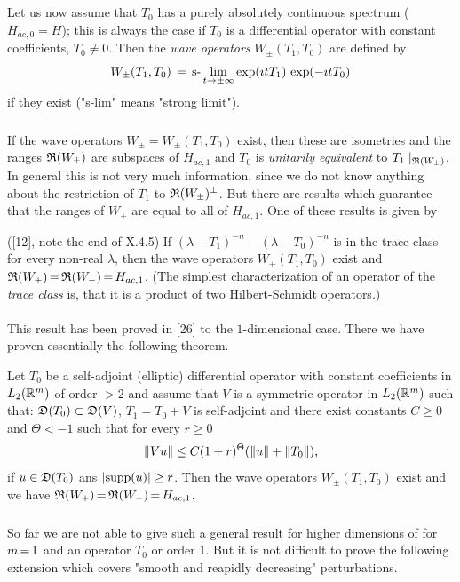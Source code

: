 \documentclass[11pt,twoside]{article}
\begin{document}
\subparagraph*{}
Let us now assume that $T_0$ has a purely absolutely continuous spectrum
({\ie} $H_{ac,0} = H$);
this is always the case if $T_0$ is a differential operator with constant
coefficients, $T_0 \neq 0$.
Then the \textit{wave operators} $W_{\pm}(T_1,T_0)$ are defined by
\[
W_{\pm}(T_1,T_0) \=
\mbox{s-}\lim_{t \to \pm \infty} \exp(itT_1) \, \exp(-itT_0)
\]
if they exist ("s-lim" means "strong limit").

\subparagraph*{}
If the wave operators $W_{\pm} = W_{\pm}(T_1,T_0)$ exist,
then these are isometries and the ranges $\range{W_{\pm}}$ are subspaces of
$H_{ac,1}$ and $T_0$ is \textit{unitarily equivalent}
to $T_1\mid_{\range{W_{\pm}}}$.
In general this is not very much information,
since we do not know anything about the restriction of $T_1$
to $\range{W_{\pm}}^{\bot}$.
But there are results which guarantee that the ranges of $W_{\pm}$ are equal
to all of $H_{ac,1}$.
One of these results is given by

\begin{theorem}([12], note the end of X.4.5)
If $(\lambda-T_1)^{-n} - (\lambda-T_0)^{-n}$ is in the trace class
for every non-real $\lambda$,
then the wave operators $W_{\pm}(T_1,T_0)$ exist and
$\range{W_+} \eq \range{W_-} \eq H_{ac,1}$.
(The simplest characterization of an operator of the \textit{trace class} is,
that it is a product of two Hilbert-Schmidt operators.)
\end{theorem}

\paragraph*{}
This result has been proved in [26] to the $1$-dimensional case.
There we have proven essentially the following theorem.

\begin{theorem}
Let $T_0$ be a self-adjoint (elliptic) differential operator with constant
coefficients in $L_2(\R^m)$ of order $>2$ and assume that $V$ is a symmetric
operator in $L_2(\R^m)$ such that:
$\domain{T_0} \subset \domain{V}$,
$T_1 = T_0 + V$ is self-adjoint and there exist constants $C \geq 0$ and
$\Theta < -1$ such that for every $r \geq 0$
\[
\norm{V u} \leq C (1+r)^{\Theta} (\norm{u} + \norm{T_0}),
\]
if $u \in \domain{T_0}$ ans $\abs{\supp{u}} \geq r$.
Then the wave operators $W_{\pm}(T_1,T_0)$ exist and we have 
$\range{W_+} \eq \range{W_-} \eq H_{ac,1}$.
\end{theorem}

\subparagraph*{}
So far we are not able to give such a general result for higher dimensions
of for $m \eq 1$ and an operator $T_0$ or order $1$.
But it is not difficult to prove the following extension which covers
"smooth and reapidly decreasing" perturbations.
\end{document}
